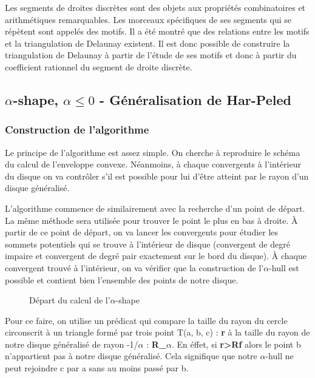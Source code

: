 Les segments de droites discrètes sont des objets aux propriétés combinatoires et arithmétiques remarquables. Les morceaux spécifiques de ses segments qui se répètent sont appelés des motifs. Il a été montré que des relations entre les motifs et la triangulation de Delaunay existent. Il est donc possible de construire la triangulation de Delaunay à partir de l'étude de ses motifs et donc à partir du coefficient rationnel du segment de droite discrète.


\subsection{$\alpha$-shape, $\alpha \leq 0$ - Généralisation de Har-Peled}

\subsubsection{Construction de l'algorithme}

Le principe de l’algorithme est assez simple. On cherche à reproduire le schéma du calcul de l’enveloppe convexe. Néanmoins, à chaque convergents à l'intérieur du disque on va contrôler s'il est possible pour lui d'être atteint par le rayon d'un disque généralisé. 

L'algorithme commence de similairement avec la recherche d'un point de départ. La même méthode sera utilisée pour trouver le point le plus en bas à droite.
À partir de ce point de départ, on va lancer les convergents pour étudier les sommets potentiels qui se trouve à l'intérieur de disque (convergent de degré impaire et convergent de degré pair exactement sur le bord du disque). À chaque convergent trouvé à l'intérieur, on va vérifier que la construction de l'$\alpha$-hull est possible et contient bien l'ensemble des points de notre disque. 

\begin{figure}[h!]
  \centering
  \caption{Départ du calcul de l'$\alpha$-shape}
\end{figure}

Pour ce faire, on utilise un prédicat qui compare la taille du rayon du cercle circonscrit à un triangle formé par trois point T(a, b, c) : \textbf{r} à la taille du rayon de notre disque généralisé de rayon -1/$\alpha$ : \textbf{R_{$\alpha$}}. En éffet, si \textbf{r>Rf} alors le point b n'appartient pas à notre disque généralisé. Cela signifique que notre $\alpha$-hull ne peut rejoindre c par a sans au moins passé par b.


